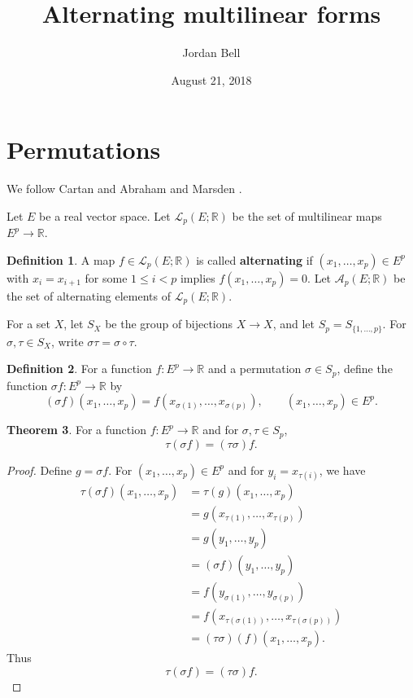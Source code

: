 \documentclass{article}
\theoremstyle{definition}
\newtheorem{theorem}{Theorem}
\theoremstyle{definition}
\newtheorem{definition}[theorem]{Definition}
\begin{document}
\title{Alternating multilinear forms}
\author{Jordan Bell}
\date{August 21, 2018}
\maketitle

\section{Permutations}
We follow Cartan \cite{cartan} and Abraham and Marsden \cite{abraham}.

Let $E$ be a real vector space.
Let $\mathscr{L}_p(E;\mathbb{R})$ be the set of multilinear maps $E^p \to \mathbb{R}$. 

\begin{definition}
A map $f \in \mathscr{L}_p(E;\mathbb{R})$ is called \textbf{alternating} if
$(x_1,\ldots,x_p) \in E^p$ with $x_i=x_{i+1}$ for some $1 \leq i < p$ implies $f(x_1,\ldots,x_p)=0$.
Let $\mathscr{A}_p(E;\mathbb{R})$ be the set of alternating elements of $\mathscr{L}_p(E;\mathbb{R})$.
\end{definition}

For a set $X$, let $S_X$ be the group of bijections $X \to X$, and let
$S_p=S_{\{1,\ldots,p\}}$.
For $\sigma,\tau \in S_X$, write $\sigma \tau = \sigma \circ \tau$.

\begin{definition}
For a function $f:E^p \to \mathbb{R}$ and a permutation $\sigma \in S_p$, define the function
$\sigma f:E^p \to \mathbb{R}$ by 
\[
(\sigma f)(x_1,\ldots,x_p) = f(x_{\sigma(1)},\ldots,x_{\sigma(p)}), \qquad (x_1,\ldots,x_p) \in E^p.
\]
\end{definition}

\begin{theorem}
For a function $f:E^p \to \mathbb{R}$ and for $\sigma,\tau \in S_p$,
\[
\tau(\sigma f) = (\tau \sigma) f.
\]
\label{action}
\end{theorem}
\begin{proof}
Define
 $g=\sigma f$. For $(x_1,\ldots,x_p) \in E^p$ and for 
$y_i = x_{\tau(i)}$, we have
\begin{align*}
\tau(\sigma f)(x_1,\ldots,x_p)&=\tau(g)(x_1,\ldots,x_p)\\
&=g(x_{\tau(1)},\ldots,x_{\tau(p)})\\
&=g(y_1,\ldots,y_p)\\
&=(\sigma f)(y_1,\ldots,y_p)\\
&=f(y_{\sigma(1)},\ldots,y_{\sigma(p)})\\
&=f(x_{\tau(\sigma(1))},\ldots,x_{\tau(\sigma(p))})\\
&=(\tau \sigma)(f)(x_1,\ldots,x_p).
\end{align*}
Thus
\[
\tau(\sigma f) = (\tau \sigma) f.
\]
\end{proof}
\end{document}
